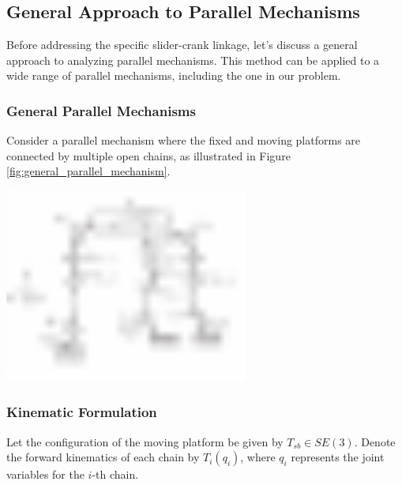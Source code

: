 \begin{solution}
	
    \subsection*{General Approach to Parallel Mechanisms}
    
    Before addressing the specific slider-crank linkage, let's discuss a general approach \cite{lynch2017modern,sun2020kinematic} to analyzing parallel mechanisms. This method can be applied to a wide range of parallel mechanisms, including the one in our problem.
    
    \subsubsection*{General Parallel Mechanisms}
    
    Consider a parallel mechanism where the fixed and moving platforms are connected by multiple open chains, as illustrated in Figure \ref{fig:general_parallel_mechanism}.
    
    \begin{center}
    \includegraphics[width=0.6\textwidth]{general_parallel_mechanism.pdf}
    \label{fig:general_parallel_mechanism}
    \end{center}
    
    \subsubsection*{Kinematic Formulation}
    
    Let the configuration of the moving platform be given by $T_{sb} \in SE(3)$. Denote the forward kinematics of each chain by $T_i(q_i)$, where $q_i$ represents the joint variables for the $i$-th chain.
    

\end{solution}

